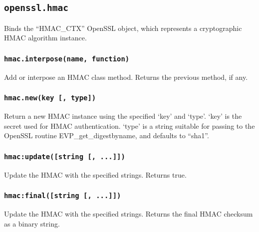 \documentclass[11pt, oneside]{memoir}
\newcommand*{\fn}[1]{\texttt{#1}\xspace}
\newcounter{toccols}
\newenvironment{Module}[1]{
	\subsection{\texttt{#1}}
	\addtocontents{toc}{
		\protect\begin{multicols}{\value{toccols}}
	}
}{
	\addtocontents{toc}{\protect\end{multicols}}
}
\begin{document}
\begin{Module}{openssl.hmac}

Binds the ``HMAC\_CTX'' OpenSSL object, which represents a cryptographic HMAC algorithm instance.

\subsubsection[\fn{hmac.interpose}]{\fn{hmac.interpose(name, function)}}

Add or interpose an HMAC class method. Returns the previous method, if any.

\subsubsection[\fn{hmac.new}]{\fn{hmac.new(key [, type])}}

Return a new HMAC instance using the specified `key' and `type'. `key' is the secret used for HMAC authentication. `type' is a string suitable for passing to the OpenSSL routine EVP\_get\_digestbyname, and defaults to ``sha1''.

\subsubsection[\fn{hmac:update}]{\fn{hmac:update([string [, ...]])}}

Update the HMAC with the specified strings. Returns true.

\subsubsection[\fn{hmac:final}]{\fn{hmac:final([string [, ...]])}}

Update the HMAC with the specified strings. Returns the final HMAC checksum as a binary string.

\end{Module}
\end{document}
